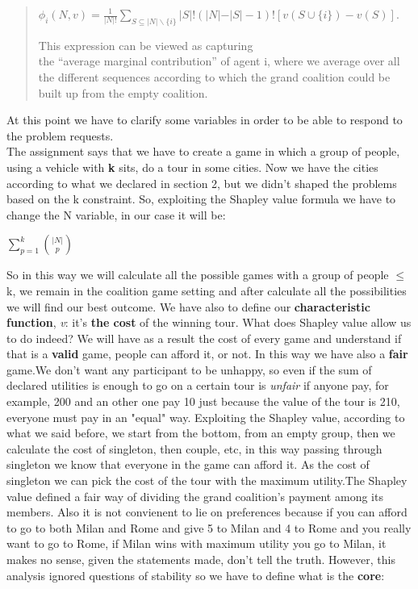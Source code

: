 \documentclass{article}
\begin{document}
{\begin{quote}
    \begin{center}
    \normalsize{
        $\phi_i(N,v) = \frac{1}{\vert N \vert !} \displaystyle \sum_{S \subseteq \vert N \vert \backslash \{i\}} \vert S \vert!(\vert N \vert -  \vert S \vert - 1)! [v(S \cup \{i\}) - v(S)]$.
    }
    \end{center}
    This expression can be viewed as capturing \\the “average marginal contribution” of agent i, where we average over all the different sequences according to which the grand coalition could be built up from the empty coalition.
\end{quote}
At this point we have to clarify some variables in order to be able to respond to the problem requests.\\
The assignment says that we have to create a game in which a group of people, using a vehicle with \textbf{k} sits, do a tour in some cities. Now we have the cities according to what we declared in section 2, but we didn't shaped the problems based on the k constraint. So, exploiting the Shapley value formula we have to change the N variable, in our case it will be:
\begin{center}
    $\displaystyle\sum_{p=1}^k \binom {{\vert N \vert}} {p}$
\end{center}
So in this way we will calculate all the possible games with a group of people $\le$ k, we remain in the coalition game setting and after calculate all the possibilities we will find our best outcome. We have also to define our \textbf{characteristic function}, \textit{v}: it's \textbf{the cost} of the winning tour. What does Shapley value allow us to do indeed? We will have as a result the cost of every game and understand if that is a \textbf{valid} game, people can afford it, or not. In this way we have also a \textbf{fair} game.We don't want any participant to be unhappy, so even if the sum of declared utilities is enough to go on a certain tour is \textit{unfair} if anyone pay, for example, 200 and an other one pay 10 just because the value of the tour is 210, everyone must pay in an "equal" way. Exploiting the Shapley value, according to what we said before, we start from the bottom, from an empty group, then we calculate the cost of singleton, then couple, etc, in this way passing through singleton we know that everyone in the game can afford it. As the cost of singleton we can pick the cost of the tour with the maximum utility.The Shapley value defined a fair way of dividing the grand coalition’s payment among its members. Also it is not convienent to lie on preferences because if you can afford to go to both Milan and Rome and give 5 to Milan and 4 to Rome and you really want to go to Rome, if Milan wins with maximum utility you go to Milan, it makes no sense, given the statements made, don't tell the truth. However, this analysis ignored questions of stability so we have to define what is the \textbf{core}:
}
\end{document}
